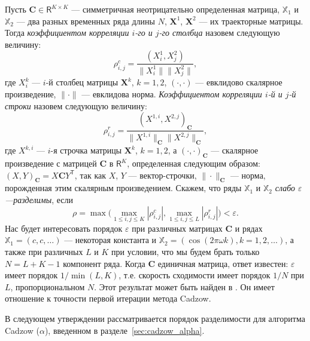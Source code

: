 \documentclass[12pt,a4paper,fleqn,leqno]{article}
\newcommand{\tsX}{\mathbb{X}}
\newcommand{\bfC}{\mathbf{C}}
\newcommand{\bfX}{\mathbf{X}}
\newcommand{\sfR}{\mathsf{R}}
\newcommand{\sfT}{\mathsf{T}}
\begin{document}
Пусть $\bfC \in \sfR^{K \times K}$ --- симметричная неотрицательно определенная матрица, $\tsX_1$ и $\tsX_2$ ---  два разных временных ряда длины $N$, $\bfX^1$, $\bfX^2$ --- их траекторные матрицы. Тогда \emph{коэффициентом корреляции $i$-го и $j$-го столбца} назовем следующую величину:
\begin{equation}\label{col_corr}
\rho^c_{i,j} = \frac{(X^1_i, X^2_j)}{\|X^1_i\| \|X^2_j\|},
\end{equation}
где $X^k_i$ --- $i$-й столбец матрицы $\bfX^k$, $k = 1, 2$, $(\cdot, \cdot)$ --- евклидово скалярное произведение, $\|\cdot\|$ --- евклидова норма. \emph{Коэффициентом корреляции $i$-й и $j$-й строки} назовем следующую величину:
\begin{equation}\label{row_corr}
\rho^r_{i,j} = \frac{(X^{1,i}, X^{2,j})_\bfC}{\|X^{1,i}\|_\bfC \|X^{2,j}\|_\bfC},
\end{equation}
где $X^{k,i}$ --- $i$-я строчка матрицы $\bfX^k$, $k = 1, 2$, а $(\cdot, \cdot)_\bfC$ --- скалярное произведение с матрицей $\bfC$ в $\sfR^K$, определенная следующим образом: $(X, Y)_\bfC = X \bfC Y^\sfT$, так как $X$, $Y$ --- вектор-строчки, $\| \cdot \|_\bfC$ --- норма, порожденная этим скалярным произведением. Скажем, что ряды $\tsX_1$ и $\tsX_2$ \emph{слабо $\varepsilon$---разделимы}, если
\begin{equation}\label{weak_sep_eq}
\rho = \max\Big(\max_{1 \le i,j \le K}|\rho^c_{i,j}|, \max_{1 \le i,j \le L}|\rho^r_{i,j}|\Big) < \varepsilon.
\end{equation}
Нас будет интересовать порядок $\varepsilon$ при различных матрицах $\bfC$ и рядах $\tsX_1 = (c, c, \ldots)$ --- некоторая константа и $\tsX_2 = (\cos(2 \pi \omega k), k = 1, 2, \ldots)$, а также при различных $L$ и $K$ при условии, что мы будем брать только $N = L + K - 1$ компонент ряда. Когда $\bfC$ единичная матрица, ответ известен: $\varepsilon$ имеет порядок $1/\min(L,K)$, т.е. скорость сходимости имеет порядок $1/N$ при $L$, пропорциональном $N$.
Этот результат может быть найден в \cite[Раздел 6.1]{Golyandina.etal2001}. Он имеет отношение к точности первой итерации метода Cadzow.

В следующем утверждении рассматривается порядок разделимости для алгоритма Cadzow ($\alpha$), введенном в разделе~\ref{sec:cadzow_alpha}.
\end{document}
